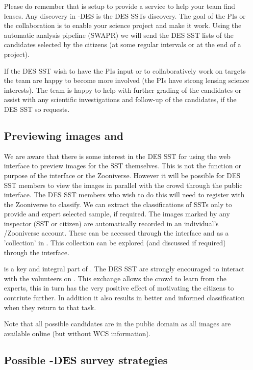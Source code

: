 \documentclass[a4paper,twocolumn]{article}
\begin{document}
Please do remember that \SW is setup to provide a service to help your team find lenses. Any discovery in \SW-DES is the DES SSTs discovery. The goal of the \SW PIs or the \SW collaboration is to enable your science project and make it work. Using the automatic analysis pipeline (SWAPR) we will send the DES SST lists of the candidates selected by the citizens (at some regular intervals or at the end of a project). 

If the DES SST wish to have the \SW PIs input or to collaboratively work on targets the \SW team are happy to become more involved (the \SW PIs have strong lensing science interests).  
The \SW team is happy to help with further grading of the candidates or assist with any scientific investigations and follow-up of the candidates, if the DES SST so requests. 

\subsection{Previewing images and \Talk}
We are aware that there is some interest in the DES SST for using the \SW web interface to preview images for the SST themselves. This is not the function or purpose of the \SW interface or the Zooniverse. However  it will be possible for DES SST members to view the images in parallel with the crowd through the public interface.  The DES SST members who wish to do this will need to register with the Zooniverse to classify. We can extract the classifications of SSTs only to provide and expert selected sample, if required. The images marked by any inspector (SST or citizen)  are automatically recorded in an individual's \SW/Zooniverse account. These can be accessed through the \SW interface and as a 'collection' in \Talk. This collection can be explored (and discussed if required) through the \Talk interface.

\SW \Talk is a key and integral part of \SW. The DES SST are strongly encouraged to interact with the volunteers on \Talk. This exchange allows the crowd to learn from the experts, this in turn has the very positive effect of motivating the citizens to contriute further. In addition it also results in better and informed classification when they return to that task. 

Note that all possible candidates are in the public domain as all images are available online (but without WCS information). 

\subsection{Possible \SW-DES survey strategies}
\end{document}
